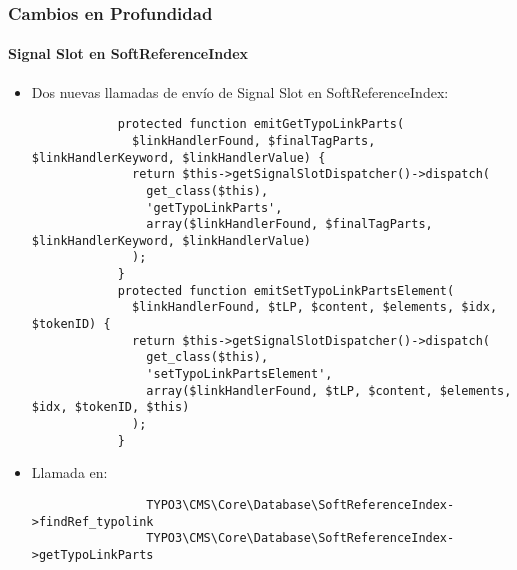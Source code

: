 \begin{frame}[fragile]
	\frametitle{Cambios en Profundidad}
	\framesubtitle{Signal Slot en SoftReferenceIndex}

	\lstset{
		basicstyle=\tiny\ttfamily
	}

	\begin{itemize}
		\item
			\smaller
				Dos nuevas llamadas de envío de Signal Slot en SoftReferenceIndex:
			\normalsize

		\begin{lstlisting}
			protected function emitGetTypoLinkParts(
			  $linkHandlerFound, $finalTagParts, $linkHandlerKeyword, $linkHandlerValue) {
			  return $this->getSignalSlotDispatcher()->dispatch(
			    get_class($this),
			    'getTypoLinkParts',
			    array($linkHandlerFound, $finalTagParts, $linkHandlerKeyword, $linkHandlerValue)
			  );
			}
			protected function emitSetTypoLinkPartsElement(
			  $linkHandlerFound, $tLP, $content, $elements, $idx, $tokenID) {
			  return $this->getSignalSlotDispatcher()->dispatch(
			    get_class($this),
			    'setTypoLinkPartsElement',
			    array($linkHandlerFound, $tLP, $content, $elements, $idx, $tokenID, $this)
			  );
			}
		\end{lstlisting}

		\item
			\smaller
				Llamada en:
			\normalsize

			\begin{lstlisting}
				TYPO3\CMS\Core\Database\SoftReferenceIndex->findRef_typolink
				TYPO3\CMS\Core\Database\SoftReferenceIndex->getTypoLinkParts
			\end{lstlisting}

	\end{itemize}

\end{frame}


